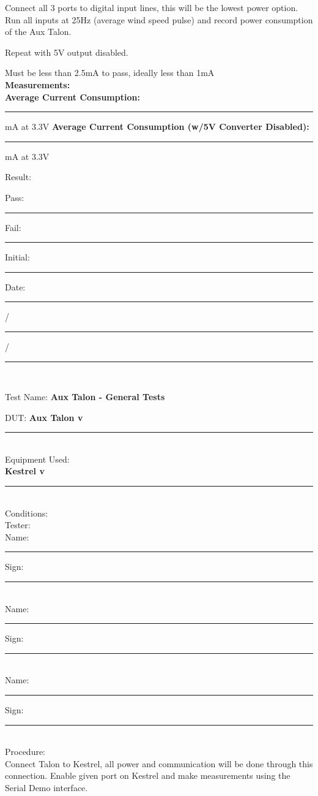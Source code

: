 Connect all 3 ports to digital input lines, this will be the lowest power option. Run all inputs at 25Hz (average wind speed pulse) and record power consumption of the Aux Talon.

Repeat with 5V output disabled.

Must be less than 2.5mA to pass, ideally less than 1mA\\[5pt]

{\Large \textbf{Measurements:}}\\[5pt]
\textbf{Average Current Consumption:} \rule{1cm}{0.15mm} mA at 3.3V 
\textbf{Average Current Consumption (w/5V Converter Disabled):} \rule{1cm}{0.15mm} mA at 3.3V 

\vfill

{\Large Result:}\\
{\large Pass: \rule{1cm}{0.15mm} \hspace{1cm} Fail: \rule{1cm}{0.15mm}} \hfill Initial: \rule{2cm}{0.15mm} \hspace{1cm} Date: \rule{0.5cm}{0.15mm}/\rule{0.5cm}{0.15mm}/\rule{1cm}{0.15mm}\\[5pt]

\pagebreak

{\Huge Test Name: \textbf{Aux Talon - General Tests}}\\[20pt]
{\Large DUT: \textbf{Aux Talon v}\rule{1cm}{0.15mm}} \\[10pt]
{\Large Equipment Used: }\\[5pt]
\textbf{Kestrel v}\rule{1cm}{0.15mm} \\[40pt]
{\Large Conditions: } \\[40pt]
{\Large Tester: }\\[10pt]
Name: \rule{4cm}{0.15mm} \hfill Sign: \rule{4cm}{0.15mm}\\[5pt]
Name: \rule{4cm}{0.15mm} \hfill Sign: \rule{4cm}{0.15mm}\\[5pt]
Name: \rule{4cm}{0.15mm} \hfill Sign: \rule{4cm}{0.15mm}\\[15pt]
{\Large Procedure: }\\
Connect Talon to Kestrel, all power and communication will be done through this connection. Enable given port on Kestrel and make measurements using the Serial Demo interface. 


